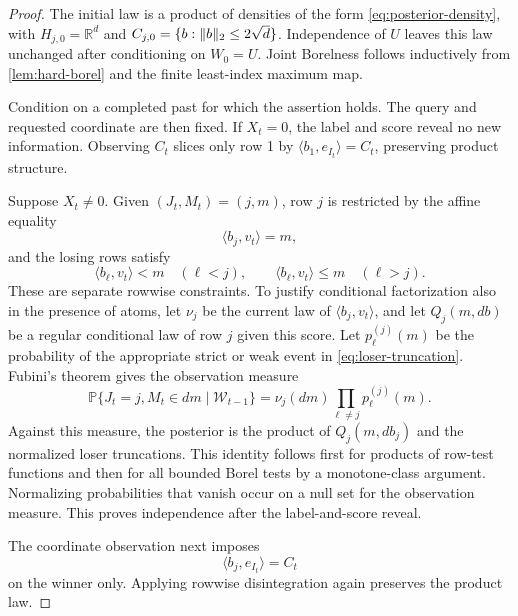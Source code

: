 \documentclass[11pt]{article}
\numberwithin{equation}{section}
\theoremstyle{definition}
\theoremstyle{remark}
\newcommand{\R}{\mathbb R}
\newcommand{\PP}{\mathbb P}
\newcommand{\cW}{\mathcal W}
\DeclarePairedDelimiter{\norm}{\lVert}{\rVert}
\newcommand{\ip}[2]{\langle #1,#2\rangle}
\begin{document}
\begin{proof}
The initial law is a product of densities of the form \eqref{eq:posterior-density}, with $H_{j,0}=\R^d$ and $C_{j,0}=\{b:\norm{b}_2\le2\sqrt d\}$. Independence of $U$ leaves this law unchanged after conditioning on $W_0=U$. Joint Borelness follows inductively from \cref{lem:hard-borel} and the finite least-index maximum map.

Condition on a completed past for which the assertion holds. The query and requested coordinate are then fixed. If $X_t=0$, the label and score reveal no new information. Observing $C_t$ slices only row 1 by $\ip{b_1}{e_{I_t}}=C_t$, preserving product structure.

Suppose $X_t\ne0$. Given $(J_t,M_t)=(j,m)$, row $j$ is restricted by the affine equality
\begin{equation}\label{eq:winner-slice}
\ip{b_j}{v_t}=m,
\end{equation}
and the losing rows satisfy
\begin{equation}\label{eq:loser-truncation}
\ip{b_\ell}{v_t}<m\quad(\ell<j),\qquad
\ip{b_\ell}{v_t}\le m\quad(\ell>j).
\end{equation}
These are separate rowwise constraints. To justify conditional factorization also in the presence of atoms, let $\nu_j$ be the current law of $\ip{b_j}{v_t}$, and let $Q_j(m,db)$ be a regular conditional law of row $j$ given this score. Let $p_\ell^{(j)}(m)$ be the probability of the appropriate strict or weak event in \eqref{eq:loser-truncation}. Fubini's theorem gives the observation measure
\begin{equation}\label{eq:max-observation-measure}
\PP\{J_t=j,M_t\in dm\mid\cW_{t-1}\}
=\nu_j(dm)\prod_{\ell\ne j}p_\ell^{(j)}(m).
\end{equation}
Against this measure, the posterior is the product of $Q_j(m,db_j)$ and the normalized loser truncations. This identity follows first for products of row-test functions and then for all bounded Borel tests by a monotone-class argument. Normalizing probabilities that vanish occur on a null set for the observation measure. This proves independence after the label-and-score reveal.

The coordinate observation next imposes
\begin{equation}\label{eq:coordinate-slice}
\ip{b_j}{e_{I_t}}=C_t
\end{equation}
on the winner only. Applying rowwise disintegration again preserves the product law.


\end{proof}
\end{document}
